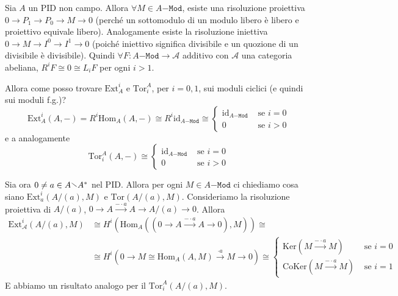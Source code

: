 \begin{example}{}
    Sia \(A\) un PID non campo. Allora \(\forall M \in A\mathtt{-Mod}\), esiste
    una risoluzione proiettiva \(0 \to P_{1} \to P_{0} \to M \to 0\) (perché un
    sottomodulo di un modulo libero è libero e proiettivo equivale libero).
    Analogamente esiste la risoluzione iniettiva \(0 \to M \to I^{0} \to I^{1}
    \to 0\) (poiché iniettivo significa divisibile e un quozione di un
    divisibile è divisibile). Quindi \(\forall F : A\mathtt{-Mod} \to
    \mathcal{A}\) additivo con \(\mathcal{A}\) una categoria abeliana, \(R^{i}F
    \cong 0 \cong L_{i} F\) per ogni \(i > 1\). 

    Allora come posso trovare \(\mathrm{Ext}_A^{i}\) e \(\mathrm{Tor}_i^{A}\),
    per \(i = 0, 1\), sui moduli ciclici (e quindi sui moduli f.g.)?
    \[
      \mathrm{Ext}_A^{i}{(A, -)} = R^{i}\mathrm{Hom}_A{(A,-)} \cong R^{i}
      \mathrm{id}_{A\mathtt{-Mod}} \cong \begin{cases}{}
          \mathrm{id}_{A\mathtt{-Mod}} & \text{ se }i = 0\\
          0 & \text{ se } i > 0
      \end{cases}
    \]
    e a analogamente
    \[
      \mathrm{Tor}_i^{A}{(A, -)} \cong \begin{cases}{}
          \mathrm{id}_{A\mathtt{-Mod}} & \text{ se } i = 0 \\
          0 & \text{ se } i > 0
      \end{cases}
    \]

    Sia ora \(0 \neq a \in A \sminus A^{*}\) nel PID. Allora per ogni \(M \in
    A\mathtt{-Mod}\) ci chiediamo cosa siano \(\mathrm{Ext}_a^{i}{(A / {(a)},
    M)}\) e \(\mathrm{Tor}{(A / {(a)}, M)}\).
    Consideriamo la risoluzione proiettiva di \(A / {(a)}\), \( 0 \to A
    \overset{-\cdot a}{\to} A \to A / {(a)} \to 0\). Allora
    \begin{align*}
        \mathrm{Ext}_\mathcal{A}^{i} {(A / {(a)}, M )} &\cong
      H^{i}{\left(\mathrm{Hom}_A{\left( {(0 \to A \overset{-\cdot a}{\to} A \to 0)},
M\right)} \right)} \cong \\ &\cong H^{i}{\left( 0 \to M \cong \mathrm{Hom}_A{(A, M)}
      \overset{\cdot a}{\to} M \to 0 \right)} \cong \begin{cases}{}
          \mathrm{Ker}{(M \overset{-\cdot a}{\to} M)} & \text{ se } i = 0 \\
          \mathrm{CoKer}{(M \overset{-\cdot a}{\to} M)} & \text{ se } i = 1
      \end{cases}
    \end{align*}
    E abbiamo un risultato analogo per il \(\mathrm{Tor}_i^{A}{(A / {(a)}, M)}\).


\end{example}
